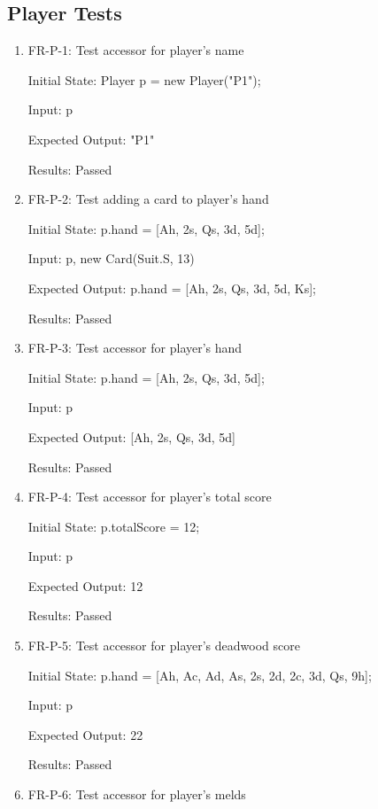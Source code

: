 \documentclass[12pt, titlepage]{article}
\begin{document}
\subsection{Player Tests}
\begin{enumerate}
    \item FR-P-1: Test accessor for player's name 
    
    Initial State: Player p = new Player("P1");
    
    Input: p
    
    Expected Output: "P1"
    
    Results: Passed
    
    \item FR-P-2: Test adding a card to player's hand
    
    Initial State: p.hand = [Ah, 2s, Qs, 3d, 5d];
    
    Input: p, new Card(Suit.S, 13)
    
    Expected Output: p.hand = [Ah, 2s, Qs, 3d, 5d, Ks];
    
    Results: Passed
    
    \item FR-P-3: Test accessor for player's hand
    
    Initial State: p.hand = [Ah, 2s, Qs, 3d, 5d];
    
    Input: p
    
    Expected Output: [Ah, 2s, Qs, 3d, 5d]
    
    Results: Passed
    
    \item FR-P-4: Test accessor for player's total score
    
    Initial State: p.totalScore = 12;
    
    Input: p
    
    Expected Output: 12
    
    Results: Passed
    
    \item FR-P-5: Test accessor for player's deadwood score
    
    Initial State: p.hand = [Ah, Ac, Ad, As, 2s, 2d, 2c, 3d, Qs, 9h];
    
    Input: p
    
    Expected Output: 22
    
    Results: Passed
    
    \item FR-P-6: Test accessor for player's melds
    

\end{enumerate}
\end{document}
